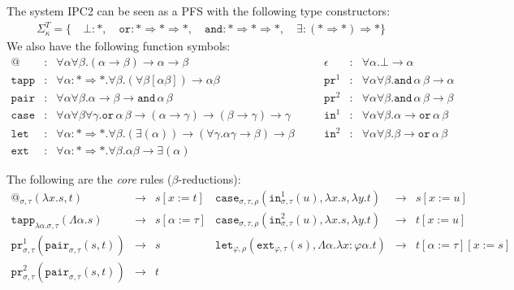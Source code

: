\documentclass[a4paper,UKenglish,cleveref,autoref,numberwithinsect]{lipics-v2019}
\theoremstyle{definition}
\newcommand{\arrkind}{\Rightarrow}
\newcommand{\arrtype}{\rightarrow}
\newcommand{\abs}[2]{\lambda #1.#2}
\newcommand{\tabs}[2]{\Lambda #1.#2}
\newcommand{\red}{\longrightarrow}
\newcommand{\proj}{\mathtt{pr}}
\begin{document}
The system IPC2 can be seen as a PFS with the following type constructors:
\[
\begin{array}{c}
\Sigma^T_\kappa = \{\quad
  \bot : *,\quad
  \mathtt{or} : * \arrkind * \arrkind *,\quad
  \mathtt{and} : * \arrkind * \arrkind *,\quad
  \exists : (* \arrkind *) \arrkind *
  \}
\end{array}
\]
We also have the following function symbols:
\[
\begin{array}{rclcrcl}
@ & : & \forall \alpha \forall \beta . (\alpha \arrtype \beta) \arrtype \alpha \arrtype \beta &
\quad &
\epsilon & : & \forall \alpha . \bot \arrtype \alpha \\

\mathtt{tapp} & : & \forall \alpha : * \arrkind * . \forall \beta .
  (\forall \beta [\alpha \beta]) \arrtype \alpha \beta &
\quad &
\proj^1 & : & \forall \alpha \forall \beta . \mathtt{and}\, \alpha\, \beta \arrtype \alpha \\

\mathtt{pair} & : & \forall \alpha \forall \beta . \alpha \arrtype \beta \arrtype
  \mathtt{and}\, \alpha\, \beta &
\quad &
\proj^2 & : & \forall \alpha \forall \beta . \mathtt{and}\, \alpha\, \beta \arrtype \beta \\

\mathtt{case} & : & \forall \alpha \forall \beta \forall \gamma . \mathtt{or}\, \alpha\, \beta \arrtype
  (\alpha \arrtype \gamma) \arrtype (\beta \arrtype \gamma) \arrtype \gamma &
\quad &
\mathtt{in}^1 & : & \forall \alpha \forall \beta . \alpha \arrtype
  \mathtt{or}\, \alpha\, \beta \\

\mathtt{let} & : & \forall \alpha : * \arrkind * . \forall \beta .
  (\exists (\alpha)) \arrtype
  (\forall \gamma . \alpha \gamma \arrtype \beta) \arrtype \beta &
\quad &
\mathtt{in}^2 & : & \forall \alpha \forall \beta . \beta \arrtype
  \mathtt{or}\, \alpha\, \beta \\

\mathtt{ext} & : & \forall \alpha : * \arrkind * . \forall \beta . \alpha \beta \arrtype
  \exists (\alpha)
\end{array}
\]

The following are the \emph{core} rules ($\beta$-reductions):
\[
\begin{array}{rclrcl}
@_{\sigma,\tau}(\abs{x}{s},t) & \red & s[x:=t] &
\mathtt{case}_{\sigma,\tau,\rho}(\mathtt{in}^1_{\sigma,\tau}(u),
  \abs{x}{s},\abs{y}{t}) & \red & s[x:=u] \\

\mathtt{tapp}_{\abs{\alpha}{\sigma},\tau}(\tabs{\alpha}{s}) & \red &
  s[\alpha:=\tau] &
\mathtt{case}_{\sigma,\tau,\rho}(\mathtt{in}^2_{\sigma,\tau}(u),
  \abs{x}{s},\abs{y}{t}) & \red & t[x:=u] \\

\proj^1_{\sigma,\tau}(\mathtt{pair}_{\sigma,\tau}(s,t)) & \red & s &
\mathtt{let}_{\varphi,\rho}(\mathtt{ext}_{\varphi,\tau}(s),
  \tabs{\alpha}{\abs{x:\varphi \alpha}{t}}) & \red & t[\alpha:=\tau][x:=s] \\

\proj^2_{\sigma,\tau}(\mathtt{pair}_{\sigma,\tau}(s,t)) & \red & t \\
\end{array}
\]
\end{document}
